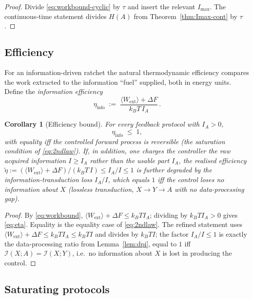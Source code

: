 \documentclass{amsart}
\newtheorem{corollary}{Corollary}
\theoremstyle{definition}
\newcommand{\kB}{k_{B}}
\newcommand{\Wext}{\langle W_{\mathrm{ext}}\rangle}
\begin{document}
\begin{proof}
Divide \eqref{eq:workbound-cyclic} by $\tau$ and insert the relevant
$I_{\max}$. The continuous-time statement divides $H(A)$ from
Theorem~\ref{thm:Imax-cont} by $\tau$.
\end{proof}

\subsection{Efficiency}

For an information-driven ratchet the natural thermodynamic efficiency
compares the work extracted to the information ``fuel'' supplied, both in
energy units. Define the \emph{information efficiency}
\begin{equation}\label{eq:eta-def}
\eta_{\mathrm{info}} \;:=\; \frac{\Wext + \Delta F}{\kB T\, I_A}\, .
\end{equation}

\begin{corollary}[Efficiency bound]\label{cor:eff}
For every feedback protocol with $I_A>0$,
\begin{equation}\label{eq:eta}
\eta_{\mathrm{info}} \;\le\; 1,
\end{equation}
with equality iff the controlled forward process is reversible (the saturation
condition of \eqref{eq:2ndlaw}). If, in addition, one charges the controller
the raw acquired information $I\ge I_A$ rather than the usable part $I_A$, the
realised efficiency
$\tilde\eta:=(\Wext+\Delta F)/(\kB T\,I)\le I_A/I\le1$ is further degraded by
the information-transduction loss $I_A/I$, which equals $1$ iff the control
loses no information about $X$ (lossless transduction, $X\to Y\to A$ with no
data-processing gap).
\end{corollary}

\begin{proof}
By \eqref{eq:workbound}, $\Wext+\Delta F\le \kB T I_A$; dividing by
$\kB T I_A>0$ gives \eqref{eq:eta}. Equality is the equality case of
\eqref{eq:2ndlaw}. The refined statement uses $\Wext+\Delta F\le\kB T I_A\le
\kB T I$ and divides by $\kB T I$; the factor $I_A/I\le1$ is exactly the
data-processing ratio from Lemma~\ref{lem:dpi}, equal to $1$ iff
$\mathcal I(X;A)=\mathcal I(X;Y)$, i.e.\ no information about $X$ is lost in
producing the control.
\end{proof}

\subsection{Saturating protocols}
\end{document}
